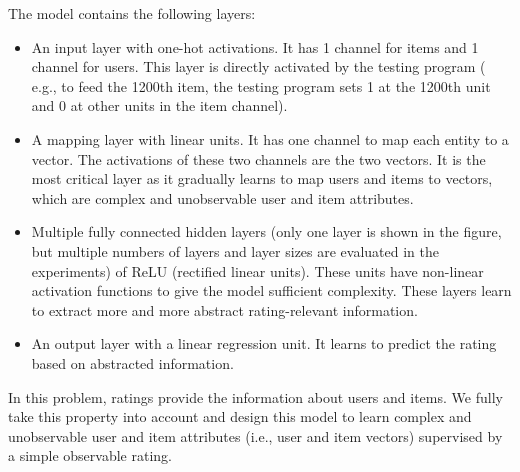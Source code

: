 \documentclass[sigconf]{acmart}
\begin{document}
The model contains the following layers:
\begin{itemize}
	\item An input layer with one-hot activations.
	It has 1 channel for items and 1 channel for users.
	This layer is directly activated by the testing program (
	e.g., to feed the 1200th item, the testing program sets 1 at the 1200th 
	unit and 0 at other units in the item channel).
	\item A mapping layer with linear units. It has one channel to map each 
	entity to a vector.
	The activations of these two channels are the two vectors.
	It is the most critical layer as it gradually learns to map users and 
	items to vectors,
	which are complex and unobservable user and item attributes.
	\item Multiple fully connected hidden layers (only one layer is shown in the
	figure, but	multiple numbers of layers and layer sizes are evaluated in 
	the experiments) of ReLU (rectified linear units).
	These units have non-linear activation functions to give the model 
	sufficient complexity.
	These layers learn to extract more and more abstract rating-relevant 
	information.
	\item An output layer with a linear regression unit.
	It learns to predict the rating based on abstracted information.
\end{itemize}
In this problem, ratings provide the information about users and items.
We fully take this property into account and design this model to learn 
complex and unobservable user and item attributes (i.e., user and item vectors) 
supervised by a simple observable rating.
\end{document}
